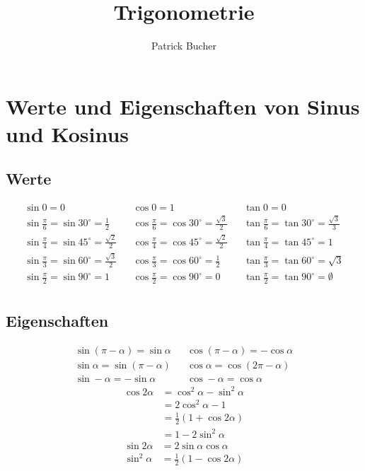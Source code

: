 \documentclass[11pt, a4paper]{scrartcl}
\title{Trigonometrie}
\author{Patrick Bucher}
\begin{document}
\maketitle
\section{Werte und Eigenschaften von Sinus und Kosinus}
	\subsection{Werte}
	\begin{align*}
		& \sin 0 = 0 &
		& \cos 0 = 1 &
		& \tan 0 = 0 &
		\\
		& \sin \frac{\pi}{6}=\sin 30^\circ = \frac{1}{2} &
		& \cos \frac{\pi}{6}=\cos 30^\circ = \frac{\sqrt{3}}{2} &
		& \tan \frac{\pi}{6}=\tan 30^\circ = \frac{\sqrt{3}}{3} &
		\\
		& \sin \frac{\pi}{4}=\sin 45^\circ = \frac{\sqrt{2}}{2} &
		& \cos \frac{\pi}{4}=\cos 45^\circ = \frac{\sqrt{2}}{2} &
		& \tan \frac{\pi}{4}=\tan 45^\circ = 1 &
		\\
		& \sin \frac{\pi}{3}=\sin 60^\circ = \frac{\sqrt{3}}{2} &
		& \cos \frac{\pi}{3}=\cos 60^\circ = \frac{1}{2} &
		& \tan \frac{\pi}{3}=\tan 60^\circ = \sqrt{3} &
		\\
		& \sin \frac{\pi}{2}=\sin 90^\circ = 1 &
		& \cos \frac{\pi}{2}=\cos 90^\circ = 0 &
		& \tan \frac{\pi}{2}=\tan 90^\circ = \emptyset &
		\\
	\end{align*}
	\subsection{Eigenschaften}
	\begin{align*}
		& \sin(\pi-\alpha) = \sin \alpha &
		& \cos(\pi-\alpha) = -\cos \alpha &
		\\
		& \sin \alpha = \sin(\pi-\alpha) &
		& \cos \alpha = \cos(2\pi-\alpha) &
		\\
		& \sin -\alpha = -\sin \alpha &
		& \cos -\alpha = \cos \alpha &
	\end{align*}
	\begin{align*}
		\cos 2\alpha & = \cos^2 \alpha - \sin^2 \alpha \\
					 & = 2\cos^2 \alpha - 1 \\
					 & = \frac{1}{2}(1+\cos 2\alpha) \\
					 & = 1 - 2\sin^2 \alpha
	\end{align*}
	\begin{align*}
		\sin 2\alpha & = 2\sin \alpha \cos \alpha \\
		\sin^2 \alpha & = \frac{1}{2}(1-\cos 2\alpha)
	\end{align*}
\end{document}
